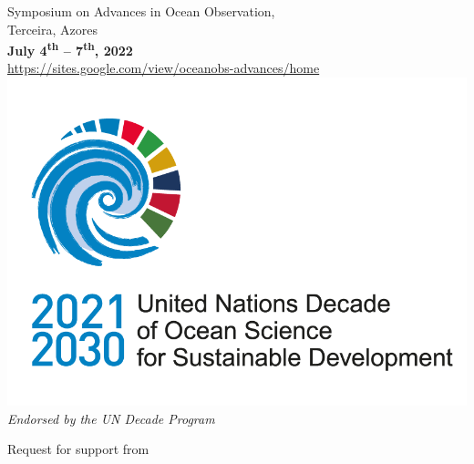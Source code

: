 
\begin{titlepage}

  \begin{center}
    \Large{Symposium on Advances in Ocean Observation,\\
      Terceira, Azores\\
      \large{\textbf{July 4\textsuperscript{th} -- 7\textsuperscript{th},
          2022}}\\
    }
    \large{\url{https://sites.google.com/view/oceanobs-advances/home}}\\
    \vspace{+1cm}
    \hspace{+0.5cm}\href{https://www.oceandecade.org/}{\includegraphics[scale=0.5]{fig/un-decade.png}}\\
    \small{\emph{Endorsed by the UN Decade Program}}
    \vspace{+2.5cm}

    \large{Request for support from \nsf}\\
    \vspace{+4.5in}
  \end{center}
\end{titlepage}